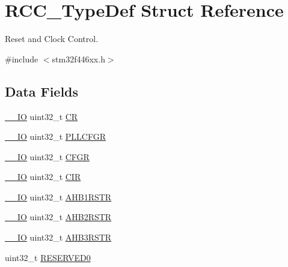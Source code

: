 \hypertarget{struct_r_c_c___type_def}{}\section{R\+C\+C\+\_\+\+Type\+Def Struct Reference}
\label{struct_r_c_c___type_def}


Reset and Clock Control.  




{\ttfamily \#include $<$stm32f446xx.\+h$>$}

\subsection*{Data Fields}
\begin{DoxyCompactItemize}
\item 
\mbox{\hyperlink{core__sc300_8h_aec43007d9998a0a0e01faede4133d6be}{\+\_\+\+\_\+\+IO}} uint32\+\_\+t \mbox{\hyperlink{struct_r_c_c___type_def_ab40c89c59391aaa9d9a8ec011dd0907a}{CR}}
\item 
\mbox{\hyperlink{core__sc300_8h_aec43007d9998a0a0e01faede4133d6be}{\+\_\+\+\_\+\+IO}} uint32\+\_\+t \mbox{\hyperlink{struct_r_c_c___type_def_ae6ff257862eba6b4b367feea786bf1fd}{P\+L\+L\+C\+F\+GR}}
\item 
\mbox{\hyperlink{core__sc300_8h_aec43007d9998a0a0e01faede4133d6be}{\+\_\+\+\_\+\+IO}} uint32\+\_\+t \mbox{\hyperlink{struct_r_c_c___type_def_a26f1e746ccbf9c9f67e7c60e61085ec1}{C\+F\+GR}}
\item 
\mbox{\hyperlink{core__sc300_8h_aec43007d9998a0a0e01faede4133d6be}{\+\_\+\+\_\+\+IO}} uint32\+\_\+t \mbox{\hyperlink{struct_r_c_c___type_def_a907d8154c80b7e385478943f90b17a3b}{C\+IR}}
\item 
\mbox{\hyperlink{core__sc300_8h_aec43007d9998a0a0e01faede4133d6be}{\+\_\+\+\_\+\+IO}} uint32\+\_\+t \mbox{\hyperlink{struct_r_c_c___type_def_a46c20c598e9e12f919f0ea47ebcbc90f}{A\+H\+B1\+R\+S\+TR}}
\item 
\mbox{\hyperlink{core__sc300_8h_aec43007d9998a0a0e01faede4133d6be}{\+\_\+\+\_\+\+IO}} uint32\+\_\+t \mbox{\hyperlink{struct_r_c_c___type_def_a78a5aa9dd5694c48a7d8e66888a46450}{A\+H\+B2\+R\+S\+TR}}
\item 
\mbox{\hyperlink{core__sc300_8h_aec43007d9998a0a0e01faede4133d6be}{\+\_\+\+\_\+\+IO}} uint32\+\_\+t \mbox{\hyperlink{struct_r_c_c___type_def_a28560c5bfeb45326ea7f2019dba57bea}{A\+H\+B3\+R\+S\+TR}}
\item 
uint32\+\_\+t \mbox{\hyperlink{struct_r_c_c___type_def_af86c61a5d38a4fc9cef942a12744486b}{R\+E\+S\+E\+R\+V\+E\+D0}}

\end{DoxyCompactItemize}
